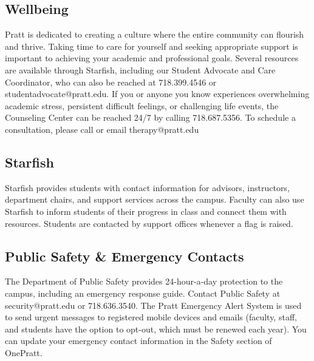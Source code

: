 \documentclass[12pt]{article}
\begin{document}
\subsection*{Wellbeing}
\label{sec:orgd6610d9}

Pratt is dedicated to creating a culture where the entire community
can flourish and thrive. Taking time to care for yourself and seeking
appropriate support is important to achieving your academic and
professional goals. Several resources are available through Starfish,
including our Student Advocate and Care Coordinator, who can also be
reached at 718.399.4546 or studentadvocate@pratt.edu. If you or anyone
you know experiences overwhelming academic stress, persistent
difficult feelings, or challenging life events, the Counseling Center
can be reached 24/7 by calling 718.687.5356. To schedule a
consultation, please call or email therapy@pratt.edu

\subsection*{Starfish}
\label{sec:org5c3d797}

Starfish provides students with contact information for advisors,
instructors, department chairs, and support services across the
campus. Faculty can also use Starfish to inform students of their
progress in class and connect them with resources. Students are
contacted by support offices whenever a flag is raised.

\subsection*{Public Safety \& Emergency Contacts}
\label{sec:orgac51916}

The Department of Public Safety provides 24-hour-a-day protection to
the campus, including an emergency response guide. Contact Public
Safety at security@pratt.edu or 718.636.3540. The Pratt Emergency
Alert System is used to send urgent messages to registered mobile
devices and emails (faculty, staff, and students have the option to
opt-out, which must be renewed each year). You can update your
emergency contact information in the Safety section of OnePratt.
\end{document}
